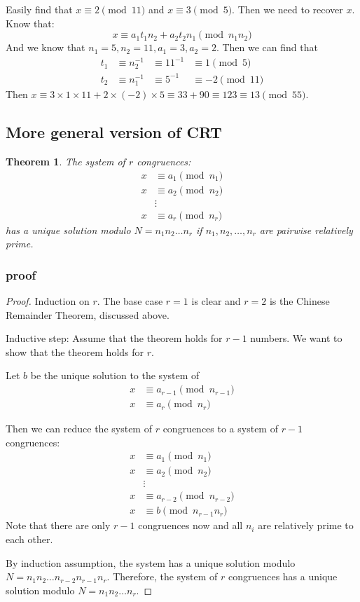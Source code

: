 \documentclass[letterpaper,12pt,oneside]{article}
\newtheorem{theorem}{Theorem}
\begin{document}
Easily find that $x\equiv 2 \pmod {11}$ and $x\equiv 3 \pmod {5}$. Then we need to recover $x$. Know that: \[
    x\equiv a_1 t_1 n_2 + a_2 t_2 n_1 \pmod {n_1n_2}
\]
And we know that $n_1 = 5, n_2 = 11, a_1 = 3, a_2 = 2$. Then we can find that \begin{align*}
    t_1 & \equiv n_2^{-1} & \equiv 11^{-1} & \equiv 1 \pmod 5 \\
    t_2 & \equiv n_1^{-1} & \equiv 5^{-1}  & \equiv -2 \pmod {11}
\end{align*}
Then $x \equiv 3\times 1\times 11+2\times (-2)\times 5 \equiv 33+90 \equiv 123 \equiv 13 \pmod {55}$.
\subsection{More general version of CRT}
\begin{theorem}
    The system of $r$ congruences: \begin{align*}
        x & \equiv a_1 \pmod {n_1} \\
        x & \equiv a_2 \pmod {n_2} \\
          & \vdots                 \\
        x & \equiv a_r \pmod {n_r}
    \end{align*}
    has a unique solution modulo $N=n_1n_2\ldots n_r$ if $n_1,n_2,\ldots,n_r$ are pairwise relatively prime.
\end{theorem}
\subsubsection{proof}
\begin{proof}
    Induction on $r$. The base case $r =1 $ is clear and $r=2$ is the Chinese Remainder Theorem, discussed above.

    Inductive step: Assume that the theorem holds for $r-1$ numbers. We want to show that the theorem holds for $r$.
    
    Let $b$ be the unique solution to the system of \begin{align*}
        x &\equiv a_{r-1} \pmod {n_{r-1}} \\
        x &\equiv a_r \pmod {n_r}
    \end{align*}

    Then we can reduce the system of $r$ congruences to a system of $r-1$ congruences: \begin{align*}
        x &\equiv a_1 \pmod {n_1} \\
        x &\equiv a_2 \pmod {n_2} \\
          &\vdots                 \\
        x &\equiv a_{r-2} \pmod {n_{r-2}} \\
        x &\equiv b \pmod {n_{r-1}n_r}
    \end{align*}
    Note that there are only $r-1$ congruences now and all $n_i$ are relatively prime to each other. 
    
    By induction assumption, the system has a unique solution modulo $N=n_1n_2\ldots n_{r-2}n_{r-1}n_r$. Therefore, the system of $r$ congruences has a unique solution modulo $N=n_1n_2\ldots n_r$.
\end{proof}
\end{document}
